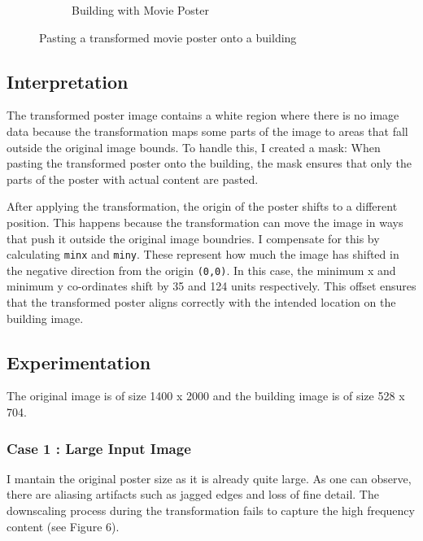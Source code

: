 \documentclass{article}
\begin{document}
\begin{figure}[H]
\begin{subfigure}{.3\textwidth}
        \caption{Building with Movie Poster}  
        \label{fig 2}
    \end{subfigure}
    \caption{Pasting a transformed movie poster onto a building}
\end{figure}

\subsection{Interpretation}
The transformed poster image contains a white region where there is no image data because the transformation maps some parts of the image
to areas that fall outside the original image bounds. To handle this, I created a mask: When pasting the transformed poster onto the building, 
the mask ensures that only the parts of the poster with actual content are pasted.

After applying the transformation, the origin of the poster shifts to a different position. This happens because the transformation can move the 
image in ways that push it outside the original image boundries. I compensate for this by calculating \texttt{minx} and \texttt{miny}. These
represent how much the image has shifted in the negative direction from the origin \texttt{(0,0)}. In this case, the minimum x and minimum y co-ordinates
shift by 35 and 124 units respectively. This offset ensures that the transformed poster aligns correctly with the intended location on the building image.


\subsection{Experimentation}
The original image is of size 1400 x 2000 and the building image is of size 528 x 704. 
\subsubsection{Case 1 : Large Input Image}
I mantain the original poster size as it is already quite large. As one can observe, there are aliasing artifacts such as jagged edges and loss of fine detail. The downscaling process during the transformation 
fails to capture the high frequency content (see Figure 6). 
\end{document}
